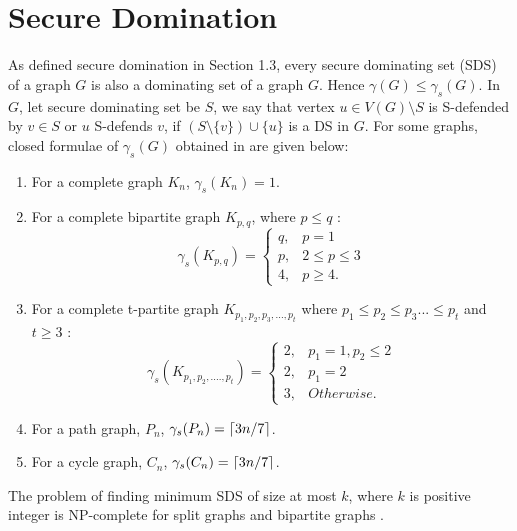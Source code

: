 \section{Secure Domination}
\noindent
As defined secure domination in Section 1.3, every secure dominating set (SDS) of a graph $G$ is also a dominating set of a graph $G$. Hence $\gamma(G) \leq \gamma_s(G)$. In $G$, let secure dominating set be $S$, we say that vertex $u \in V(G)\setminus S$ is S-defended by $v \in S$ or $u$ S-defends $v$, if $(S \setminus \{ v \}) \cup \{ u \}$ is a DS in $G$. For some graphs, closed formulae of $\gamma_s(G)$ obtained in \cite{Cockayne} are given below:
\begin{enumerate}
\item
For a complete graph $K_n$, $\gamma_s(K_n)=1$. 
\item
For a complete bipartite graph $K_{p,q}$, where $p \leq q$ :
\[
	\gamma_s (K_{p,q}) = 
	\begin{cases}
	q,& p = 1 \\
	p,& 2 \leq p \leq 3 \\
	4,& p \geq 4.
	\end{cases} 
\] 
\item
For a complete t-partite graph $K_{p_1,p_2,p_3,...,p_t}$ where $p_1 \leq p_2 \leq p_3 ... \leq p_t$ and $t \geq 3$ :
\[
\gamma_s(K_{p_1,p_2,....,p_t}) = 
\begin{cases}
2,& p_1 = 1, p_2 \leq 2 \\
2,& p_1 = 2 \\
3,& Otherwise.
\end{cases}
\]
\item
For a path graph, $P_n$, $\gamma_s(P_n)= \lceil3n/7\rceil$. 
\item
For a cycle graph, $C_n$, $\gamma_s(C_n)= \lceil3n/7\rceil$.
\end{enumerate} 
\noindent
The problem of finding minimum SDS of size at most $k$, where $k$ is positive integer is NP-complete for split graphs and bipartite graphs \cite{Meroune}. 
